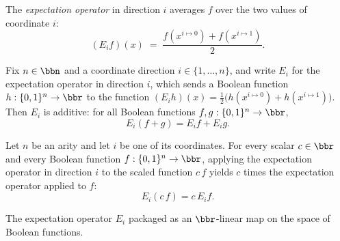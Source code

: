 \begin{definition}
\label{BooleanAnalysis.expectationOperator}
\leanok
{}
The \emph{expectation operator} in direction $i$ averages $f$ over the two
values of coordinate $i$:
\[
  (E_i f)(x) \;=\; \frac{f(x^{i\mapsto 0}) + f(x^{i\mapsto 1})}{2}.
\]
\end{definition}

\begin{lemma}
\label{BooleanAnalysis.expectation_add}
\leanok
{}
Fix $n \in \bbn$ and a coordinate direction $i \in \{1,\dots,n\}$, and write $E_i$ for
the expectation operator in direction $i$, which sends a Boolean function $h : \{0,1\}^n
\to \bbr$ to the function $(E_i h)(x) = \tfrac{1}{2}\bigl(h(x^{i\mapsto 0}) +
h(x^{i\mapsto 1})\bigr)$. Then $E_i$ is additive: for all Boolean functions $f, g :
\{0,1\}^n \to \bbr$,
\[
  E_i(f + g) = E_i f + E_i g.
\]
\end{lemma}

\begin{lemma}
\label{BooleanAnalysis.expectation_smul}
\leanok
{}
Let $n$ be an arity and let $i$ be one of its coordinates. For every scalar $c \in \bbr$
and every Boolean function $f : \{0,1\}^n \to \bbr$, applying the expectation operator
in direction $i$ to the scaled function $c\,f$ yields $c$ times the expectation operator
applied to $f$:
\[
  E_i(c\,f) = c\,E_i f.
\]
\end{lemma}

\begin{definition}
\label{BooleanAnalysis.expectationLm}
\leanok
{}
The expectation operator $E_i$ packaged as an $\bbr$-linear map on the space of
Boolean functions.
\end{definition}

